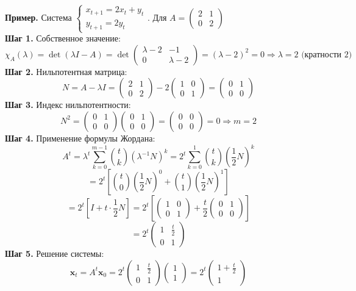 \textbf{Пример.} Система $\begin{cases} x_{t+1} = 2x_t + y_t \\ y_{t+1} = 2y_t \end{cases}$. Для $A = \begin{pmatrix} 2 & 1 \\ 0 & 2 \end{pmatrix}$\\
\textbf{Шаг 1.} Собственное значение:
$$\chi_A(\lambda) = \det(\lambda I - A) = \det\begin{pmatrix} \lambda-2 & -1 \\ 0 & \lambda-2 \end{pmatrix} = (\lambda-2)^2 = 0 \Rightarrow \lambda = 2 \text{ (кратности 2)}$$
\textbf{Шаг 2.} Нильпотентная матрица:
$$N = A - \lambda I = \begin{pmatrix} 2 & 1 \\ 0 & 2 \end{pmatrix} - 2\begin{pmatrix} 1 & 0 \\ 0 & 1 \end{pmatrix} = \begin{pmatrix} 0 & 1 \\ 0 & 0 \end{pmatrix}$$
\textbf{Шаг 3.} Индекс нильпотентности:
$$N^2 = \begin{pmatrix} 0 & 1 \\ 0 & 0 \end{pmatrix}\begin{pmatrix} 0 & 1 \\ 0 & 0 \end{pmatrix} = \begin{pmatrix} 0 & 0 \\ 0 & 0 \end{pmatrix} = 0 \Rightarrow m = 2$$
\textbf{Шаг 4.} Применение формулы Жордана:
$$A^t = \lambda^t \sum_{k=0}^{m-1} \binom{t}{k} (\lambda^{-1}N)^k = 2^t \sum_{k=0}^{1} \binom{t}{k} \left(\frac{1}{2}N\right)^k$$
$$= 2^t \left[ \binom{t}{0} \left(\frac{1}{2}N\right)^0 + \binom{t}{1} \left(\frac{1}{2}N\right)^1 \right]$$
$$= 2^t \left[ I + t \cdot \frac{1}{2}N \right] = 2^t \left[ \begin{pmatrix} 1 & 0 \\ 0 & 1 \end{pmatrix} + \frac{t}{2}\begin{pmatrix} 0 & 1 \\ 0 & 0 \end{pmatrix} \right]$$
$$= 2^t \begin{pmatrix} 1 & \frac{t}{2} \\ 0 & 1 \end{pmatrix}$$
\textbf{Шаг 5.} Решение системы:
$$\mathbf{x}_t = A^t\mathbf{x}_0 = 2^t \begin{pmatrix} 1 & \frac{t}{2} \\ 0 & 1 \end{pmatrix}\begin{pmatrix} 1 \\ 1 \end{pmatrix} = 2^t \begin{pmatrix} 1 + \frac{t}{2} \\ 1 \end{pmatrix}$$

